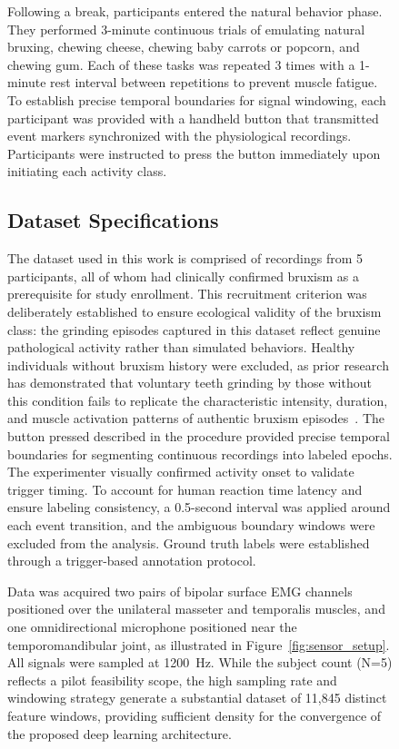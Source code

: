 \documentclass[pdflatex,sn-vancouver-num, iicol]{sn-jnl}
\begin{document}
\begin{figure}[h]
Following a break, participants entered the natural behavior phase. They performed 3-minute continuous trials of emulating natural bruxing, chewing cheese, chewing baby carrots or popcorn, and chewing gum. Each of these tasks was repeated 3 times with a 1-minute rest interval between repetitions to prevent muscle fatigue. To establish precise temporal boundaries for signal windowing, each participant was provided with a handheld button that transmitted event markers synchronized with the physiological recordings. Participants were instructed to press the button immediately upon initiating each activity class.


\subsection{Dataset Specifications}

The dataset used in this work is comprised of recordings from 5 participants, all of whom had clinically confirmed bruxism as a prerequisite for study enrollment. This recruitment criterion was deliberately established to ensure ecological validity of the bruxism class: the grinding episodes captured in this dataset reflect genuine pathological activity rather than simulated behaviors. Healthy individuals without bruxism history were excluded, as prior research has demonstrated that voluntary teeth grinding by those without this condition fails to replicate the characteristic intensity, duration, and muscle activation patterns of authentic bruxism episodes~\cite{lavigne2008bruxism}.  The button pressed described in the procedure provided precise temporal boundaries for segmenting continuous recordings into labeled epochs. The experimenter visually confirmed activity onset to validate trigger timing. To account for human reaction time latency and ensure labeling consistency, a 0.5-second interval was applied around each event transition, and the ambiguous boundary windows were excluded from the analysis. Ground truth labels were established through a trigger-based annotation protocol.

Data was acquired two pairs of bipolar surface EMG channels positioned over the unilateral masseter and temporalis muscles, and one omnidirectional microphone positioned near the temporomandibular joint, as illustrated in Figure~\ref{fig:sensor_setup}. All signals were sampled at 1200~Hz. While the subject count (N=5) reflects a pilot feasibility scope, the high sampling rate and windowing strategy generate a substantial dataset of 11,845 distinct feature windows, providing sufficient density for the convergence of the proposed deep learning architecture.


\end{figure}
\end{document}
